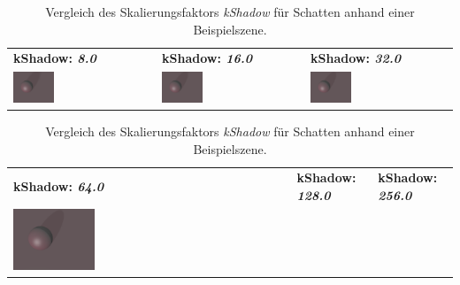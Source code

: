 \begin{table}[H]
    \centering
    \caption{Vergleich des Skalierungsfaktors \textit{kShadow} für Schatten anhand einer Beispielszene.}\label{table:sphere_tracing_shadows}
    \begin{tabular}{p{}p{}p{}}
        \toprule
            \textbf{kShadow: \textit{8.0}} &
            \textbf{kShadow: \textit{16.0}}   &
            \textbf{kShadow: \textit{32.0}}   \\
        \cmidrule(r){1-1}\cmidrule(lr){2-2}\cmidrule(l){3-3}
            \includegraphics[width=0.3\textwidth]{img/sphere_tracing_shadows_8.png} \newline &
            \includegraphics[width=0.3\textwidth]{img/sphere_tracing_shadows_16.png} \newline &
            \includegraphics[width=0.3\textwidth]{img/sphere_tracing_shadows_32.png} \newline \\
        \bottomrule
    \end{tabular}
    \begin{tabular}{p{}p{}p{}}
        \toprule
            \textbf{kShadow: \textit{64.0}} &
            \textbf{kShadow: \textit{128.0}}   &
            \textbf{kShadow: \textit{256.0}}   \\
        \cmidrule(r){1-1}\cmidrule(lr){2-2}\cmidrule(l){3-3}
            \includegraphics[width=0.3\textwidth]{img/sphere_tracing_shadows_64.png} \newline &

\end{tabular}
\end{table}
